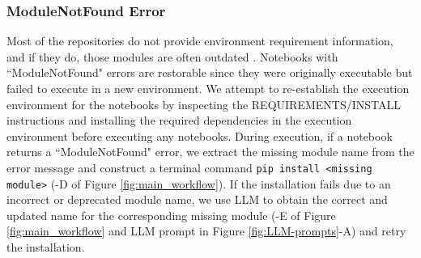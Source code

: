         \subsubsection{ModuleNotFound Error}
            Most of the repositories do not provide environment requirement information, and if they do, those modules are often outdated \cite{Zhu2021, Wang2021}. Notebooks with ``ModuleNotFound" errors are restorable since they were originally executable but failed to execute in a new environment. We attempt to re-establish the execution environment for the notebooks by inspecting the REQUIREMENTS/INSTALL instructions and installing the required dependencies in the execution environment before executing any notebooks. During execution, if a notebook returns a ``ModuleNotFound" error, we extract the missing module name from the error message and construct a terminal command {\small{\texttt{pip install <missing module>}}} (-D of Figure \ref{fig:main_workflow}). If the installation fails due to an incorrect or deprecated module name, we use LLM to obtain the correct and updated name for the corresponding missing module (-E of Figure \ref{fig:main_workflow} and LLM prompt in Figure \ref{fig:LLM-prompts}-A) and retry the installation. 
            
            
         

    
